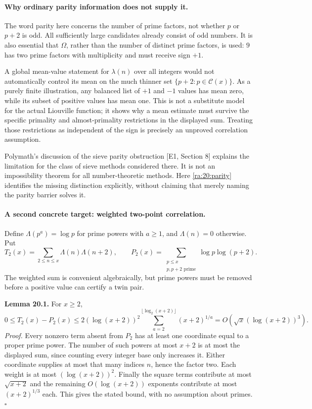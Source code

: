 \documentclass[11pt]{article}
\begin{document}
\paragraph{Why ordinary parity information does not supply it.}
The word parity here concerns the number of prime factors, not whether
$p$ or $p+2$ is odd. All sufficiently large candidates already consist
of odd numbers. It is also essential that $\Omega$, rather than the
number of distinct prime factors, is used: $9$ has two prime factors
with multiplicity and must receive sign $+1$.

A global mean-value statement for $\lambda(n)$ over all integers would
not automatically control its mean on the much thinner set
$\{p+2:p\in\mathcal C(x)\}$. As a purely finite illustration, any
balanced list of $+1$ and $-1$ values has mean zero, while its subset of
positive values has mean one. This is not a substitute model for the
actual Liouville function; it shows why a mean estimate must survive the
specific primality and almost-primality restrictions in the displayed
sum. Treating those restrictions as independent of the sign is precisely
an unproved correlation assumption.

Polymath's discussion of the sieve parity obstruction [E1, Section 8]
explains the limitation for the class of sieve methods considered there.
It is not an impossibility theorem for all number-theoretic methods.
Here \eqref{ra:20:parity} identifies the missing distinction explicitly,
without claiming that merely naming the parity barrier solves it.

\paragraph{A second concrete target: weighted two-point correlation.}
Define $\Lambda(p^a)=\log p$ for prime powers with $a\ge1$, and
$\Lambda(n)=0$ otherwise. Put
\[
 T_2(x)=\sum_{2\le n\le x}\Lambda(n)\Lambda(n+2),\qquad
 P_2(x)=\sum_{\substack{p\le x\\p,p+2\text{ prime}}}
                                      \log p\log(p+2).
\]
The weighted sum is convenient algebraically, but prime powers must be
removed before a positive value can certify a twin pair.

\textbf{Lemma 20.1.} For $x\ge2$,
\[
 0\le T_2(x)-P_2(x)
 \le2(\log(x+2))^2
       \sum_{a=2}^{\lfloor\log_2(x+2)\rfloor}(x+2)^{1/a}
       =O(\sqrt x(\log(x+2))^3).
\]
\textit{Proof.}
Every nonzero term absent from $P_2$ has at least one coordinate equal
to a proper prime power. The number of such powers at most $x+2$ is
at most the displayed sum, since counting every integer base only
increases it. Either coordinate supplies at most that many indices
$n$, hence the factor two. Each weight is at most $(\log(x+2))^2$.
Finally the square terms contribute at most $\sqrt{x+2}$ and the
remaining $O(\log(x+2))$ exponents contribute at most $(x+2)^{1/3}$
each. This gives the stated bound, with no assumption about primes.
\hfill$\square$
\end{document}
